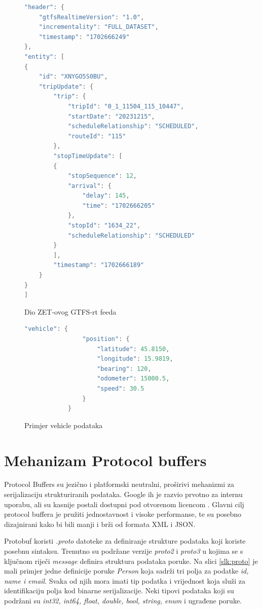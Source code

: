 \documentclass[zavrsnirad]{fer}
\begin{document}
\begin{figure}[H]
	\centering
	

	\begin{minipage}[htb]{0.58\linewidth}
		\centering
		
		\begin{lstlisting}[language=Java]
"header": {
	"gtfsRealtimeVersion": "1.0",
	"incrementality": "FULL_DATASET",
	"timestamp": "1702666249"
},
"entity": [
{
	"id": "XNYGO5S0BU",
	"tripUpdate": {
		"trip": {
			"tripId": "0_1_11504_115_10447",
			"startDate": "20231215",
			"scheduleRelationship": "SCHEDULED",
			"routeId": "115"
		},
		"stopTimeUpdate": [
		{
			"stopSequence": 12,
			"arrival": {
				"delay": 145,
				"time": "1702666205"
			},
			"stopId": "1634_22",
			"scheduleRelationship": "SCHEDULED"
		}
		],
		"timestamp": "1702666189"
	}
}
]
		\end{lstlisting} 
		\caption{Dio ZET-ovog GTFS-rt feeda}
		\label{slk:reply1}
	\end{minipage}
	\hfill
	\begin{minipage}[htb]{0.38\linewidth}
		\centering
		\begin{lstlisting}[language=Java]
			"vehicle": {
				"position": {
					"latitude": 45.8150,
					"longitude": 15.9819,
					"bearing": 120,
					"odometer": 15000.5,
					"speed": 30.5
				}
			}
		\end{lstlisting}
		\caption{Primjer vehicle podataka}
		\label{slk:reply2}
	\end{minipage}
\end{figure}


\newpage
\chapter{Mehanizam Protocol buffers}
\label{sec:protobuf}

Protocol Buffers su jezično i platformski neutralni, proširivi mehanizmi za serijalizaciju strukturiranih podataka. Google ih je razvio prvotno za internu uporabu, ali su kasnije postali dostupni pod otvorenom licencom \cite{protobuf}. Glavni cilj protocol buffera je pružiti jednostavnost i visoke performanse, te su posebno dizajnirani kako bi bili manji i brži od formata XML i JSON.


Protobuf koristi \textit{.proto} datoteke za definiranje strukture podataka koji koriste posebnu sintaksu. Trenutno su podržane verzije \textit{proto2} i \textit{proto3} u kojima se s ključnom riječi \textit{message} definira struktura podataka poruke. Na slici \ref{slk:proto} je mali primjer jedne definicije poruke \textit{Person} koja sadrži tri polja za podatke \textit{id, name i email}. Svaka od njih mora imati tip podatka i vrijednost koja služi za identifikaciju polja kod binarne serijalizacije. Neki tipovi podataka koji su podržani su \textit{int32, int64, float, double, bool, string, enum} i ugrađene poruke.
\end{document}
